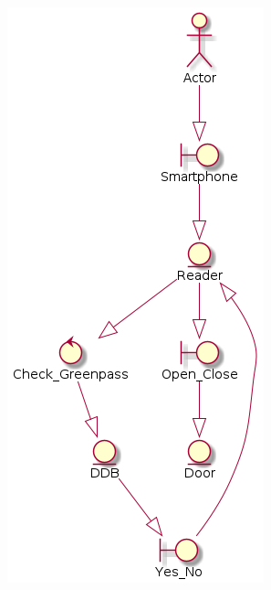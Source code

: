 \documentclass[12pt]{article}
\begin{document}
\begin{figure}[H]
    \includegraphics[width=\textwidth,height=\textheight,keepaspectratio]{./Images/System_Draw.png}
    \label{47_1}
\end{figure}
\end{document}
